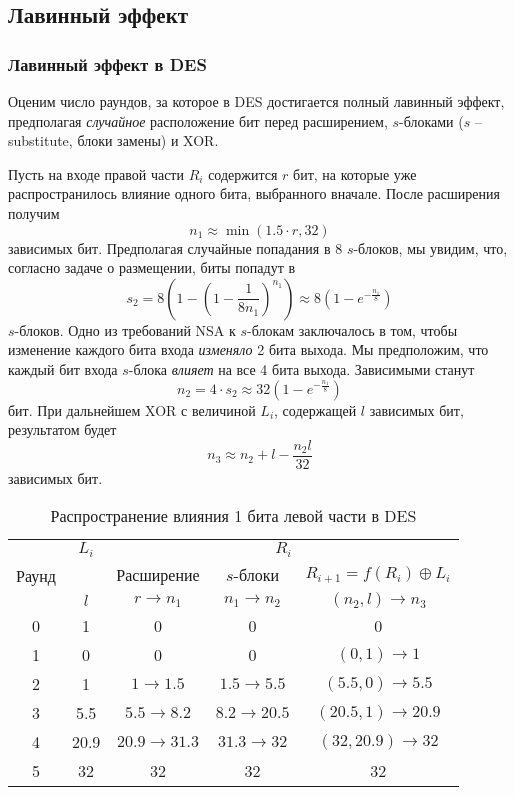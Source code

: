 \subsection{Лавинный эффект}

\subsubsection{Лавинный эффект в DES}

Оценим число раундов, за которое в DES достигается полный лавинный эффект, предполагая \emph{случайное} расположение бит перед расширением, $s$-блоками ($s$ -- substitute, блоки замены) и XOR.

Пусть на входе правой части $R_i$ содержится $r$ бит, на которые уже распространилось влияние одного бита, выбранного вначале. После расширения получим
    \[ n_1 \approx \min(1.5 \cdot r, 32) \]
зависимых бит. Предполагая случайные попадания в 8 $s$-блоков, мы увидим, что, согласно задаче о размещении, биты попадут в
    \[ s_2 = 8 \left( 1 - \left( 1 - \frac{1}{{8}{n_1}} \right)^{n_1} \right) \approx 8 \left( 1 - e^{-\frac{n_1}{8}} \right) \]
$s$-блоков. Одно из требований NSA к $s$-блокам заключалось в том, чтобы изменение каждого бита входа \emph{изменяло} 2 бита выхода. Мы предположим, что каждый бит входа $s$-блока \emph{влияет} на все 4 бита выхода. Зависимыми станут
    \[ n_2 = 4 \cdot s_2 \approx 32 \left( 1 - e^{-\frac{n_1}{8}} \right) \]
бит. При дальнейшем XOR с величиной $L_i$, содержащей $l$ зависимых бит, результатом будет
    \[ n_3 \approx n_2 + l  - \frac{n_2 l}{32} \]
зависимых бит.

\begin{table}[!ht]
    \centering
    \caption{Распространение влияния 1 бита левой части в DES\label{tab-DES-avalance-effect}}
    \begin{tabular}{||c||c||c|c|c||}
        \hline
        \multirow{3}{*}{Раунд} & $L_i$ & \multicolumn{3}{|c||}{$R_i$} \\
        \cline{2-5}
        & & Расширение & $s$-блоки & $R_{i+1} = f(R_i) \oplus L_i$ \\
        & $l$ & $r \rightarrow n_1$ & $n_1 \rightarrow n_2$ & $(n_2, l) \rightarrow n_3$ \\
        \hline \hline
        0 & 1 & 0 & 0 & 0 \\
        1 & 0 & 0 & 0 & $(0,1) \rightarrow 1$ \\
        2 & 1 & $1 \rightarrow 1.5$ & $1.5 \rightarrow 5.5$ & $(5.5, 0) \rightarrow 5.5$ \\
        3 & 5.5 & $5.5 \rightarrow 8.2$ & $8.2 \rightarrow 20.5$ & $(20.5, 1) \rightarrow 20.9$ \\
        4 & 20.9 & $20.9 \rightarrow 31.3$ & $31.3 \rightarrow 32$ & $(32, 20.9) \rightarrow 32$ \\
        5 & 32 & 32 & 32 & 32 \\
      \hline
    \end{tabular}
\end{table}

